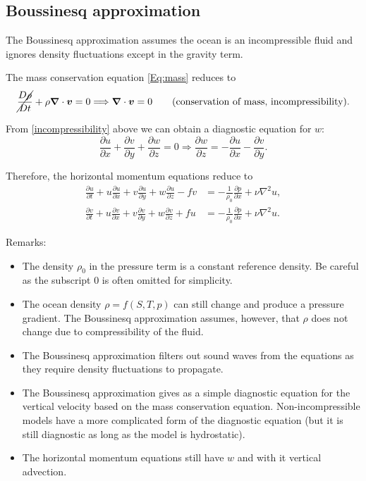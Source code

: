\subsection{Boussinesq approximation}
The Boussinesq approximation assumes the ocean is an incompressible fluid and ignores density fluctuations except in the gravity term.

The mass conservation equation \ref{Eq:mass} reduces to
\begin{equation}
\cancel{\frac{D\rho}{Dt}} + \rho \boldsymbol{\nabla} \cdot \boldsymbol{v} = 0 \Longrightarrow  \boldsymbol{\nabla} \cdot \boldsymbol{v} = 0 \qquad \text{(conservation of mass, incompressibility).} \label{incompressibility}
\end{equation}

From \eqref{incompressibility} above we can obtain a diagnostic equation for $w$:
\begin{equation}
 \frac{\partial u}{\partial x} + \frac{\partial v}{\partial y} + \frac{\partial w}{\partial z} = 0 \Longrightarrow
 \frac{\partial w}{\partial z} = -\frac{\partial u}{\partial x} - \frac{\partial v}{\partial y}.
\end{equation}

Therefore, the horizontal momentum equations reduce to
\begin{equation}
\begin{aligned}
\frac{\partial u}{\partial t} + u\frac{\partial u}{\partial x} + v\frac{\partial u}{\partial y} + w\frac{\partial u}{\partial z} -fv &= -\frac{1}{\rho_0} \frac{\partial p}{\partial x} + \nu \nabla^2 u, \\
\frac{\partial v}{\partial t} + u\frac{\partial v}{\partial x} + v\frac{\partial v}{\partial y} + w\frac{\partial v}{\partial z} +fu &= -\frac{1}{\rho_0} \frac{\partial p}{\partial x} + \nu \nabla^2 u.
\end{aligned}
\end{equation}

Remarks: 
\begin{itemize}
\item The density $\rho_0$ in the pressure term is a constant reference density. Be careful as the subscript 0 is often omitted for simplicity.
\item The ocean density $\rho = f(S, T, p)$ can still change and produce a pressure gradient. The Boussinesq approximation assumes, however, that $\rho$ does not change due to compressibility of the fluid.
\item The Boussinesq approximation filters out sound waves from the equations as they require density fluctuations to propagate.
\item The Boussinesq approximation gives as a simple diagnostic equation for the vertical velocity based on the mass conservation equation. Non-incompressible models have a more complicated form of the diagnostic equation (but it is still diagnostic as long as the model is hydrostatic).
\item The horizontal momentum equations still have $w$ and with it vertical advection. 
\end{itemize} 
